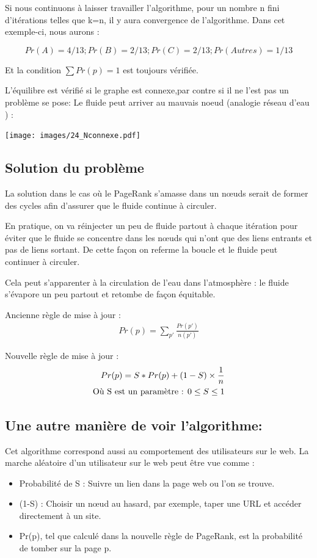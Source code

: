 Si nous continuons à laisser travailler l'algorithme, pour un nombre n fini d'itérations telles que k=n, il y aura convergence de l'algorithme. Dans cet exemple-ci,  nous aurons :

	$$Pr(A) = 4/13 ; Pr(B) = 2/13 ; Pr(C) = 2/13 ; Pr(Autres) = 1/13$$
 
Et la condition $\sum Pr(p) = 1$ est toujours vérifiée.
 
 L'équilibre est vérifié si le graphe est connexe,par contre si il ne l'est pas un problème se pose: Le fluide peut arriver au mauvais noeud (analogie réseau d'eau )  :

\texttt{[image: images/24\_Nconnexe.pdf]}

\subsection*{Solution du problème}
	La solution dans le cas où le PageRank s'amasse dans un nœuds serait de former des cycles afin d'assurer que le fluide continue à circuler.
	
 	En pratique, on va réinjecter un peu de fluide partout à chaque itération pour éviter que le fluide se concentre dans les nœuds qui n'ont que des liens entrants et pas de liens sortant. De cette façon on referme la boucle et le fluide peut continuer à circuler.
 	
 	Cela peut s'apparenter à la circulation de l'eau dans l'atmosphère : le fluide s'évapore un peu partout et retombe de façon équitable.

	Ancienne règle de mise à jour :
	\begin{align*}
	Pr(p) =  \sum_ {p'}\frac{Pr(p')}{n(p')}
	\end{align*}
	
 	Nouvelle règle de mise à jour : \\
	\begin{align*}
         Pr(p) = S*Pr(p) + (1-S)  \times \frac{1}{n} \\
	 \text{Où S est un paramètre : $ 0 \le S \le 1 $} 
	\end{align*}
        
\subsection*{ Une autre manière de voir l'algorithme:}
    Cet algorithme correspond aussi au comportement des utilisateurs sur le web. La marche aléatoire d'un utilisateur sur le web peut être vue comme : 
	\begin{itemize}
        \item Probabilité de S : Suivre un lien dans la page web ou l'on se trouve.
        \item (1-S) : Choisir un n\oe ud au hasard, par exemple, taper une URL et accéder directement à un site.
        \item Pr(p), tel que calculé dans la nouvelle règle de PageRank, est la probabilité de tomber sur la page p.
	\end{itemize}
	
